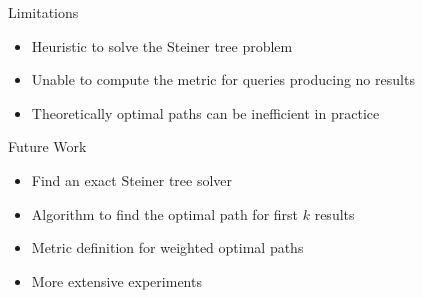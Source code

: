 \begin{frame}{Limitations}
    \begin{itemize}
        \item Heuristic to solve the Steiner tree problem
        \item Unable to compute the metric for queries producing no results
        \item Theoretically optimal paths can be inefficient in practice
    \end{itemize}
\end{frame}

\begin{frame}{Future Work}
    \begin{itemize}
        \item Find an exact Steiner tree solver
        \item Algorithm to find the optimal path for first $ k $ results
        \item Metric definition for weighted optimal paths
        \item More extensive experiments
    \end{itemize}
\end{frame}